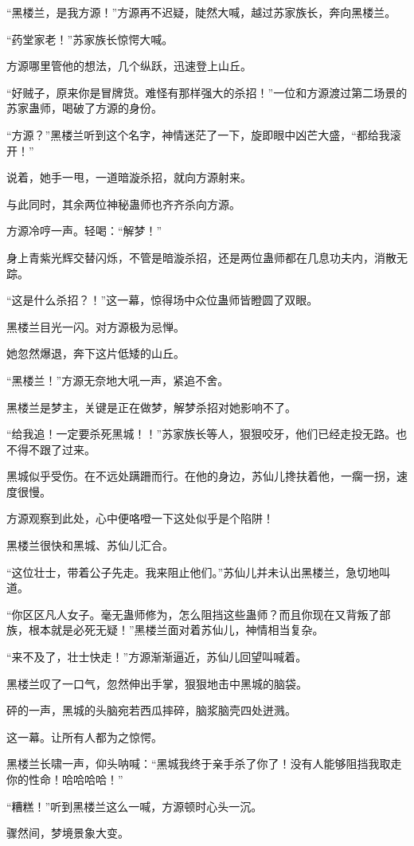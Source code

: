 \begin{this_body}
“黑楼兰，是我方源！”方源再不迟疑，陡然大喊，越过苏家族长，奔向黑楼兰。

“药堂家老！”苏家族长惊愕大喊。

方源哪里管他的想法，几个纵跃，迅速登上山丘。

“好贼子，原来你是冒牌货。难怪有那样强大的杀招！”一位和方源渡过第二场景的苏家蛊师，喝破了方源的身份。

“方源？”黑楼兰听到这个名字，神情迷茫了一下，旋即眼中凶芒大盛，“都给我滚开！”

说着，她手一甩，一道暗漩杀招，就向方源射来。

与此同时，其余两位神秘蛊师也齐齐杀向方源。

方源冷哼一声。轻喝：“解梦！”

身上青紫光辉交替闪烁，不管是暗漩杀招，还是两位蛊师都在几息功夫内，消散无踪。

“这是什么杀招？！”这一幕，惊得场中众位蛊师皆瞪圆了双眼。

黑楼兰目光一闪。对方源极为忌惮。

她忽然爆退，奔下这片低矮的山丘。

“黑楼兰！”方源无奈地大吼一声，紧追不舍。

黑楼兰是梦主，关键是正在做梦，解梦杀招对她影响不了。

“给我追！一定要杀死黑城！！”苏家族长等人，狠狠咬牙，他们已经走投无路。也不得不跟了过来。

黑城似乎受伤。在不远处蹒跚而行。在他的身边，苏仙儿搀扶着他，一瘸一拐，速度很慢。

方源观察到此处，心中便咯噔一下这处似乎是个陷阱！

黑楼兰很快和黑城、苏仙儿汇合。

“这位壮士，带着公子先走。我来阻止他们。”苏仙儿并未认出黑楼兰，急切地叫道。

“你区区凡人女子。毫无蛊师修为，怎么阻挡这些蛊师？而且你现在又背叛了部族，根本就是必死无疑！”黑楼兰面对着苏仙儿，神情相当复杂。

“来不及了，壮士快走！”方源渐渐逼近，苏仙儿回望叫喊着。

黑楼兰叹了一口气，忽然伸出手掌，狠狠地击中黑城的脑袋。

砰的一声，黑城的头脑宛若西瓜摔碎，脑浆脑壳四处迸溅。

这一幕。让所有人都为之惊愕。

黑楼兰长啸一声，仰头呐喊：“黑城我终于亲手杀了你了！没有人能够阻挡我取走你的性命！哈哈哈哈！”

“糟糕！”听到黑楼兰这么一喊，方源顿时心头一沉。

骤然间，梦境景象大变。


\end{this_body}
